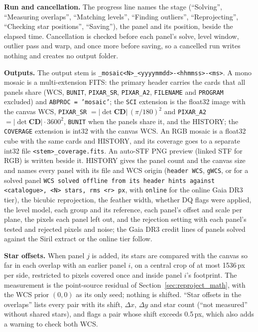 \documentclass[11pt,a4paper]{article}
\newcommand{\code}[1]{\texttt{\small #1}}
\newcommand{\mat}[1]{\mathbf{#1}}
\begin{document}
    \textbf{Run and cancellation.} The progress line names the stage (``Solving'', ``Measuring overlaps'', ``Matching levels'', ``Finding outliers'', ``Reprojecting'', ``Checking star positions'', ``Saving''), the panel and its position, beside the elapsed time. Cancellation is checked before each panel's solve, level window, outlier pass and warp, and once more before saving, so a cancelled run writes nothing and creates no output folder.

    \textbf{Outputs.} The output stem is \code{<first panel>\_mosaic<N>\_<yyyymmdd>-<hhmmss>-<ms>}. A mono mosaic is a multi-extension FITS: the primary header carries the cards that all panels share (WCS, \code{BUNIT}, \code{PIXAR\_SR}, \code{PIXAR\_A2}, \code{FILENAME} and \code{PROGRAM} excluded) and \code{ABPROC = 'mosaic'}; the \code{SCI} extension is the float32 image with the canvas WCS, \code{PIXAR\_SR} $= |\det \mat{CD}|\,(\pi/180)^2$ and \code{PIXAR\_A2} $= |\det \mat{CD}| \cdot 3600^2$, \code{BUNIT} when the panels share it, and the HISTORY; the \code{COVERAGE} extension is int32 with the canvas WCS. An RGB mosaic is a float32 cube with the same cards and HISTORY, and its coverage goes to a separate int32 file \code{<stem>\_coverage.fits}. An auto-STF PNG preview (linked STF for RGB) is written beside it. HISTORY gives the panel count and the canvas size and names every panel with its file and WCS origin (\code{header WCS}, \code{gWCS}, or for a solved panel \code{WCS solved offline from its header hints against <catalogue>, <N> stars, rms <r> px}, with \code{online} for the online Gaia DR3 tier), the bicubic reprojection, the feather width, whether DQ flags were applied, the level model, each group and its reference, each panel's offset and scale per plane, the pixels each panel left out, and the rejection setting with each panel's tested and rejected pixels and noise; the Gaia DR3 credit lines of panels solved against the Siril extract or the online tier follow.

    \textbf{Star offsets.} When panel $j$ is added, its stars are compared with the canvas so far in each overlap with an earlier panel $i$, on a central crop of at most 1536\,px per side, restricted to pixels covered once and inside panel $i$'s footprint. The measurement is the point-source residual of Section~\ref{sec:reproject_math}, with the WCS prior $(0, 0)$ as its only seed; nothing is shifted. ``Star offsets in the overlaps'' lists every pair with its shift, $\Delta x$, $\Delta y$ and star count (``not measured'' without shared stars), and flags a pair whose shift exceeds 0.5\,px, which also adds a warning to check both WCS.
\end{document}

